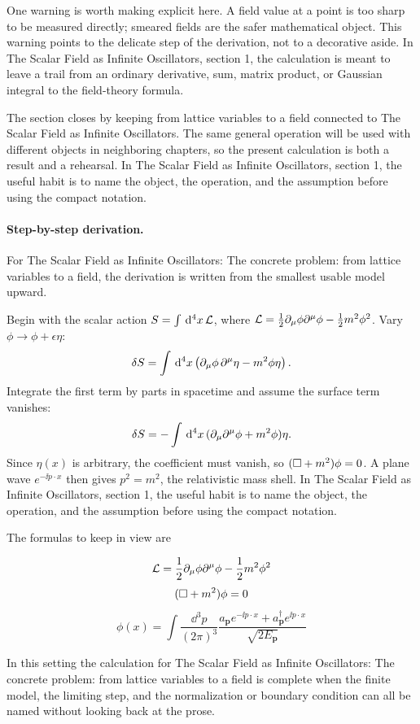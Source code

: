 One warning is worth making explicit here.  A field value at a point is too sharp to be measured directly; smeared fields are the safer mathematical object.  This warning points to the delicate step of the derivation, not to a decorative aside.  In The Scalar Field as Infinite Oscillators, section 1, the calculation is meant to leave a trail from an ordinary derivative, sum, matrix product, or Gaussian integral to the field-theory formula.

The section closes by keeping from lattice variables to a field connected to The Scalar Field as Infinite Oscillators.  The same general operation will be used with different objects in neighboring chapters, so the present calculation is both a result and a rehearsal.  In The Scalar Field as Infinite Oscillators, section 1, the useful habit is to name the object, the operation, and the assumption before using the compact notation.



\paragraph{Step-by-step derivation.}

For The Scalar Field as Infinite Oscillators: The concrete problem: from lattice variables to a field, the derivation is written from the smallest usable model upward.

Begin with the scalar action \(S=\int\,\mathrm d^4x\,\mathcal L\), where \(\mathcal L=\frac12\partial_\mu\phi\partial^\mu\phi-\frac12m^2\phi^2\).  Vary \(\phi\to\phi+\epsilon\eta\):
\[
  \delta S=\int\,\mathrm d^4x\left(\partial_\mu\phi\,\partial^\mu\eta-m^2\phi\eta\right).
\]
Integrate the first term by parts in spacetime and assume the surface term vanishes:
\[
  \delta S=-\int\,\mathrm d^4x\,(\partial_\mu\partial^\mu\phi+m^2\phi)\eta.
\]
Since \(\eta(x)\) is arbitrary, the coefficient must vanish, so \((\Box+m^2)\phi=0\).  A plane wave \(e^{-\ii p\cdot x}\) then gives \(p^2=m^2\), the relativistic mass shell.  In The Scalar Field as Infinite Oscillators, section 1, the useful habit is to name the object, the operation, and the assumption before using the compact notation.

The formulas to keep in view are

\[
  \mathcal L=\frac12\partial_\mu\phi\partial^\mu\phi-\frac12m^2\phi^2
\]
\[
  (\Box+m^2)\phi=0
\]
\[
  \phi(x)=\int\frac{\dd^3p}{(2\pi)^3}\frac{a_{\bm p}e^{-\ii p\cdot x}+a_{\bm p}^\dagger e^{\ii p\cdot x}}{\sqrt{2E_{\bm p}}}
\]

In this setting the calculation for The Scalar Field as Infinite Oscillators: The concrete problem: from lattice variables to a field is complete when the finite model, the limiting step, and the normalization or boundary condition can all be named without looking back at the prose.




